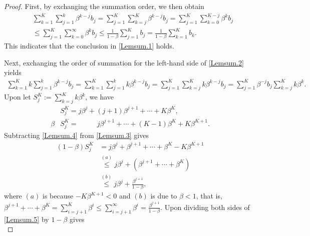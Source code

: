\documentclass[twoside,11pt]{article}
\begin{document}
\begin{proof}
First, by exchanging the summation order, we then obtain
\begin{equation}
   	\begin{aligned}
   	&\sum_{k=1}^{K}\sum_{j=1}^{k}\beta^{k-j}b_j
   	=\sum_{j=1}^{K}\sum_{k=j}^{K}\beta^{k-j}b_j
   	=\sum_{j=1}^{K}\sum_{k=0}^{K-j}\beta^{k}b_j\\
   	&\le\sum_{j=1}^{K}\sum_{k=0}^{\infty}\beta^{k}b_j
   	\le\frac{1}{1-\beta}\sum_{j=1}^{K}b_j
   	=\frac{1}{1-\beta}\sum_{k=1}^{K}b_k.\nonumber
   	\end{aligned}
\end{equation}
This indicates that the conclusion in \eqref{Lemsum.1} holds.
\par Next, exchanging the order of summation for the left-hand side of \eqref{Lemsum.2} yields
\begin{equation}\label{equation}
   	\begin{aligned}
   	\sum_{k=1}^{K}k\sum_{j=1}^{k}\beta^{k-j}b_j
   	=\sum_{k=1}^{K}\sum_{j=1}^{k}k\beta^{k-j}b_j
   	=\sum_{j=1}^{K}\sum_{k=j}^{K}k\beta^{k-j}b_j
   	=\sum_{j=1}^{K}\beta^{-j}b_j\sum_{k=j}^{K}k\beta^{k}.
   	\end{aligned}
\end{equation}
Upon let $S_j^K:=\sum_{k=j}^{K}k\beta^{k}$, we have
\begin{align}
   	\label{Lemsum.3}&S_j^K=j \beta^j+(j+1) \beta^{j+1}+\cdots+K \beta^K,\\
   	\label{Lemsum.4}\beta &S_j^K=\ \ \ \ \ \ \ \ \ \ \ \ j \beta^{j+1}+\cdots+(K-1)\beta^K+K\beta^{K+1}.
\end{align}
Subtracting \eqref{Lemsum.4} from \eqref{Lemsum.3} gives
\begin{equation}\label{Lemsum.5}
   	\begin{aligned}
   	(1-\beta)S_j^K
   	&=j \beta^j+\beta^{j+1}+\cdots+ \beta^K-K\beta^{K+1}\\
   	&\overset{(a)}{\le}j \beta^j+\left( \beta^{j+1}+\cdots+ \beta^K\right) 
   	\\
   	&\overset{(b)}{\le}j \beta^j+\frac{\beta^{j+1}}{1-\beta},
   	\end{aligned}
\end{equation}
where $(a)$ is because $-K\beta^{K+1}<0$ and $(b)$ is due to $\beta<1$, that is, $\beta^{j+1}+\cdots+ \beta^K=\sum_{i=j+1}^{K}\beta^i\le\sum_{i=j+1}^{\infty}\beta^i=\frac{\beta^{j+1}}{1-\beta}$. Upon dividing both sides of \eqref{Lemsum.5} by $1-\beta$ gives
\begin{equation}

\end{equation}
\end{proof}
\end{document}
